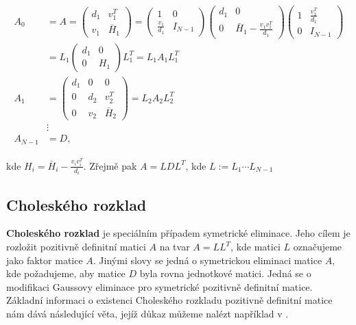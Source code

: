 \documentclass[11pt,american,czech,oneside]{book}
\theoremstyle{plain}
\theoremstyle{definition}
\begin{document}
\begin{gather}
\begin{aligned}
\label{SymEl}
A_0 & = A = \left( \begin{matrix}
               d_1 & v_1^T \\
               v_1 & \bar{H}_1
             \end{matrix} \right)
           =\left(\begin{matrix}
              1               & 0 \\
              \frac{v_1}{d_1} & I_{N-1}
            \end{matrix} \right)
            \left(\begin{matrix}
              d_1 & 0 \\
              0   & \bar{H}_1-\frac{v_1v_1^T}{d_1}
            \end{matrix} \right)
            \left(\begin{matrix}
              1 & \frac{v_1^T}{d_1} \\
              0 & I_{N-1}
            \end{matrix} \right) \\
    &     = L_1
            \left(\begin{matrix}
              d_1 & 0 \\
              0 & H_1
            \end{matrix} \right)
            L_1^T
          = L_1 A_1 L_1^T \\
  A_1 & = \left( \begin{matrix}
               d_1 &  0   & 0 \\
               0   &  d_2 & v_2^T \\
               0   &  v_2 & \bar{H}_2
             \end{matrix} \right)
        =  L_2 A_2 L_2^T \\
    & \vdots \\
  A_{N-1} & = D,
\end{aligned}
\end{gather}

kde $H_i=\bar{H}_i-\frac{v_i v_i^T}{d_i}$.
Zřejmě pak $A = LDL^T$, kde $L:=L_1\cdots L_{N-1}$

\subsection{Choleského rozklad}
\label{CholeskyChapter}
\textbf{Choleského rozklad} je speciálním případem symetrické eliminace. Jeho cílem je rozložit pozitivně definitní matici $A$ na tvar $A=LL^T$, kde matici $L$ označujeme jako faktor matice $A$. Jinými slovy se jedná o symetrickou eliminaci matice $A$, kde požadujeme, aby matice $D$ byla rovna jednotkové matici. Jedná se o modifikaci Gaussovy eliminace pro symetrické pozitivně definitní matice. Základní informaci o existenci Choleského rozkladu pozitivně definitní matice nám dává následující věta, jejíž důkaz můžeme nalézt například v \cite{govl:83}.
\end{document}
